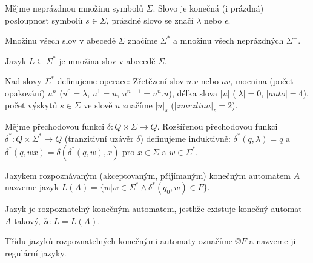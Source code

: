 \documentclass[12pt]{article}                   %
\begin{document}
    \begin{definice}
        Mějme neprázdnou množinu symbolů $\Sigma$. Slovo je konečná (i prázdná) posloupnost symbolů $s \in \Sigma$, prázdné slovo se značí $\lambda$ nebo $\epsilon$.

        Množinu všech slov v abecedě $\Sigma$ značíme $\Sigma^*$ a množinu všech neprázdných $\Sigma^+$.

        Jazyk $L \subseteq \Sigma^*$ je množina slov v abecedě $\Sigma$.
    \end{definice}

    \begin{definice}
        Nad slovy $\Sigma^*$ definujeme operace: Zřetězení slov $u.v$ nebo $uv$, mocnina (počet opakování) $u^n$ ($u^0 = \lambda$, $u^1 = u$, $u^{n+1} = u^n.u$), délka slova $|u|$ ($|\lambda| = 0$, $|auto| = 4$), počet výskytů $s \in \Sigma$ ve slově $u$ značíme $|u|_s$ ($|zmrzlina|_z = 2$).
    \end{definice}

    \begin{definice}
        Mějme přechodovou funkci $\delta: Q \times \Sigma \rightarrow Q$. Rozšířenou přechodovou funkci $\delta^*: Q \times \Sigma^* \rightarrow Q$ (tranzitivní uzávěr $\delta$) definujeme induktivně: $\delta^*(q, \lambda) = q$ a $\delta^*(q, wx) = \delta(\delta^*(q, w), x)$ pro $x \in \Sigma$ a $w \in \Sigma^*$.
    \end{definice}

    \begin{definice}
        Jazykem rozpoznávaným (akceptovaným, přijímaným) konečným automatem $A$ nazveme jazyk $L(A) = \{w | w \in \Sigma^* \land \delta^*(q_0, w) \in F\}$.

        Jazyk je rozpoznatelný konečným automatem, jestliže existuje konečný automat $A$ takový, že $L = L(A)$.

        Třídu jazyků rozpoznatelných konečnými automaty označíme $©F$ a nazveme ji regulární jazyky.
    \end{definice}
\end{document}
